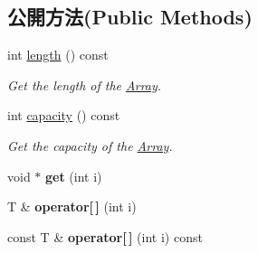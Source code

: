 \subsection*{公開方法(Public Methods)}
\begin{DoxyCompactItemize}
\item 
int \hyperlink{class_i_dream_sky_1_1_array_a46af21a2ffe8c495b36f358ed28c3cb6}{length} () const 
\begin{DoxyCompactList}\small\item\em Get the length of the \hyperlink{class_i_dream_sky_1_1_array}{Array}. \end{DoxyCompactList}\item 
int \hyperlink{class_i_dream_sky_1_1_array_a47c79e1e38c2608caa2a47c38e5d31cd}{capacity} () const 
\begin{DoxyCompactList}\small\item\em Get the capacity of the \hyperlink{class_i_dream_sky_1_1_array}{Array}. \end{DoxyCompactList}\item 
void $\ast$ {\bfseries get} (int i)\hypertarget{class_i_dream_sky_1_1_array_adb3d84100dfa37c06480ac406911ad9f}{}\label{class_i_dream_sky_1_1_array_adb3d84100dfa37c06480ac406911ad9f}

\item 
T \& {\bfseries operator\mbox{[}$\,$\mbox{]}} (int i)\hypertarget{class_i_dream_sky_1_1_array_a185e59c0f9af1111eea031cda9c57d5a}{}\label{class_i_dream_sky_1_1_array_a185e59c0f9af1111eea031cda9c57d5a}

\item 
const T \& {\bfseries operator\mbox{[}$\,$\mbox{]}} (int i) const \hypertarget{class_i_dream_sky_1_1_array_a3f070f255c99432cf4a531191a8dbd84}{}\label{class_i_dream_sky_1_1_array_a3f070f255c99432cf4a531191a8dbd84}


\end{DoxyCompactItemize}
